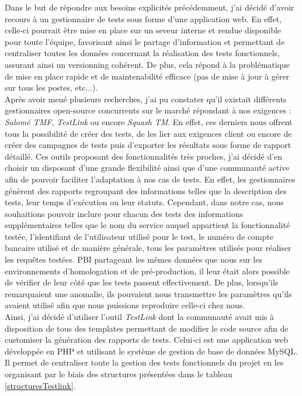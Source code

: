 	Dans le but de répondre aux besoins explicités précédemment, j'ai décidé d'avoir recours à un gestionnaire de tests sous forme d'une application web. En effet, celle-ci pourrait être mise en place sur un seveur interne et rendue disponible pour toute l'équipe, favorisant ainsi le partage d'information et permettant de centraliser toutes les données concernant la réalisation des tests fonctionnels, assurant ainsi un versionning cohérent. De plus, cela répond à la problématique de mise en place rapide et de maintenabilité efficace (pas de mise à jour à gérer sur tous les postes, etc...). \\
	
	Après avoir mené plusieurs recherches, j'ai pu constater qu'il existait différents gestionnaires open-source concurrents sur le marché répondant à nos exigences : \textit{Salomé TMF}, \textit{TestLink} ou encore \textit{Squash TM}. En effet, ces derniers nous offrent tous la possibilité de créer des tests, de les lier aux exigences client ou encore de créer des campagnes de tests puis d'exporter les résultats sous forme de rapport détaillé. Ces outils proposant des fonctionnalités très proches, j'ai décidé d'en choisir un disposant d'une grande flexibilité ainsi que d'une communauté active afin de pouvoir faciliter l'adaptation à nos cas de tests. En effet, les gestionnaires génèrent des rapports regroupant des informations telles que la description des tests, leur temps d'exécution ou leur statuts. Cependant, dans notre cas, nous souhaitions pouvoir inclure pour chacun des tests des informations supplémentaires telles que le nom du service auquel appartient la fonctionnalité testée, l'identifiant de l'utilisateur utilisé pour le test, le numéro de compte bancaire utilisé et de manière générale, tous les paramètres utilisés pour réaliser les requêtes testées. PBI partageant les mêmes données que nous sur les environnements d'homologation et de pré-production, il leur était alors possible de vérifier de leur côté que les tests passent effectivement. De plus, lorsqu'ils remarquaient une anomalie, ils pouvaient nous transmettre les paramètres qu'ils avaient utilisé afin que nous puissions reproduire celle-ci chez nous. \\
	
	Ainsi, j'ai décidé d'utiliser l'outil \textit{TestLink} dont la communauté avait mis à disposition de tous des templates permettant de modifier le code source afin de customiser la génération des rapports de tests. Celui-ci est une application web développée en PHP et utilisant le système de gestion de base de données MySQL. Il permet de centraliser toute la gestion des tests fonctionnels du projet en les organisant par le biais des structures présentées dans le tableau \ref{structuresTestlink}.
	
